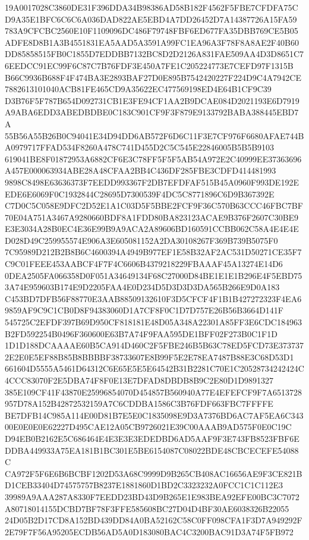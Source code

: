 \documentclass[UTF8,fontset=fandol,zihao=-4,a4paper]{ctexart}
\begin{document}
{{19A0017028C3860DE31F396DDA34B98386AD58B182F4562F5FBE7CFDFA75CD9A35E1BFC6C6C6A036DAD822AE5EBD4A7DD26452D7A14387726A15FA59
783A9CFCBC2560E10F1109096DC486F79748FBF6ED677FA35DBB769CE5B05ADFE8D8B1A3B4551831EA5AAD5A3591A99FC1EA96A3F78F8A8AE2F40B60
DD85858515FB0C1855D7EDDBB7132BC8D2D2126A831FAE509AA4D3D8651C76EEDCC91EC99F6C87C7B76FDF3E450A7FE1C205224773E7CEFD97F1315B
B66C9936B688F4F474BA3E2893BAF27D0E895B7542420227F224D9C4A7942CE7882613101040ACB81FE465CD9A35622EC477569198ED4E64B1CF9C39
D3B76F5F787B654D092731CB1E3FE94CF1AA2B9DCAE084D2021193E6D7919A9ABA6EDD3ABEDBDBE0C183C901CF9F3F879E9133792BABA388445EBD7A
55B56A55B26B0C94041E34D94DD6AB572F6D6C11F3E7CF976F6680AFAE744BA0979717FFAD534F8260A478C741D455D2C5C545E22846005B5B5B9103
619041BE8F01872953A6882CF6E3C78FF5F5F5AB54A972E2C40999EE37363696A457E000063934ABE28A48CFAA2BB4C436DF285FBE3CDFD414481993
9898C8498E63636373F7EEDD993367F2DB7EFDFAF515B45A0960F993DE192EEDE6E6069F0C1932844C28695D7300539F4DC5C8771896C6D9B367392E
C7D0C5C058E9DFC2D52E1A1C03D5F5BBE2FCF9F36C570B63CCC46FBC7BF70E04A751A3467A9280660BDF8A1FDD80BA823123ACAE9B376F2607C30BE9
E3E3034A28B0EC4E36E99B9A9ACA2A89606BD160591CCBB062C58A4E4E4ED028D49C259955574E906A3E605081152A2DA30108267F369B739B5075F0
7C95989D212B2B8B6C4600394A4949B977EF1E58B32AF2AC531D50271CE35F7C9C01FEEE453AABCF4F7F4C6606B4379218229FBAAAF45A13274E14D6
0DEA2505FA066358D0F051A34649134F68C27000D84BE1E1E1B296E4F5EBD753A74E959603B174E9D2205FAA4E0D234D5D3D3D3DA565B266E9D0A183
C453BD7DFB56F88770E3AAB88509132610F3D5CFCF4F1B1B427272323F4EA69859AF9C9C1CB0D8F94383060D1A7CF8F0C1D7D757E26B56B3664D141F
545725C2EFDF397B69D950CF818181E48D05A348A22301A85FF3E6CDC184963B2FD592254B0496F360600E63B7A74F9FAA595DE1BFF02F273B0C1F1D
1D1D188DCAAAAE60B5CA914D460C2F5FBE246B5B63C78ED5FCD73E3737372E2E0E5EF88B85B8BBBBF38733607E8B99F5E2E78EA7487B88E3C68D53D1
661604D5555A5461D64312C6E65E5E5E64542B31B2281C70E1C20528734242424C4CCC83070F2E5DBA74F8F0E13E7DFAD8DBDB8B9C2E80D1D9891327
385E109CF41F43870E25996854070D454857B560940A77E4EFEFCF9F7A6513728957D78A152B42872532159A7C6CDDBA1586C3B76FDF663FBC7FFFFE
BE7DFB14C985A114E00D81B7E5E0C1835098E9D3A7376BD6AC7AF5EA6C34300E0E0E0E62227D495CAE12A05CB9726021E39C00AAAB9AD575F0E0C19C
D94EB0B2162E5C686464E4E3E3E3EDEDBD6AD5AAF9F3E743FB8523FBF6EDDBA449933A75EA181B1BC301E5BE6154087C08022BDE48CBCECEFE54088C
CA972F5F6E6B6BCBF1202D53A68C9999D9B265CB408AC16656AE9F3CE821BD1CEB33404D74575757B8237E1881860D1BD2C3323232A0FCC1C1C112E3
39989A9AAA287A8330F7EEDD23BD43D9B265E1E983BEA92EFE00BC3C7072A80718014155DCBD7BF78F3FFE585608BC27D04D4BF30AE6038326B22055
24D05B2D17CD8A152BD439DD84A0BA52162C58C0FF098CFA1F3D7A949292F2E79F7F56A95205ECDB56AD5A0D183080BAC4C3200BAC91D3A74F5FB972
}}
\end{document}
